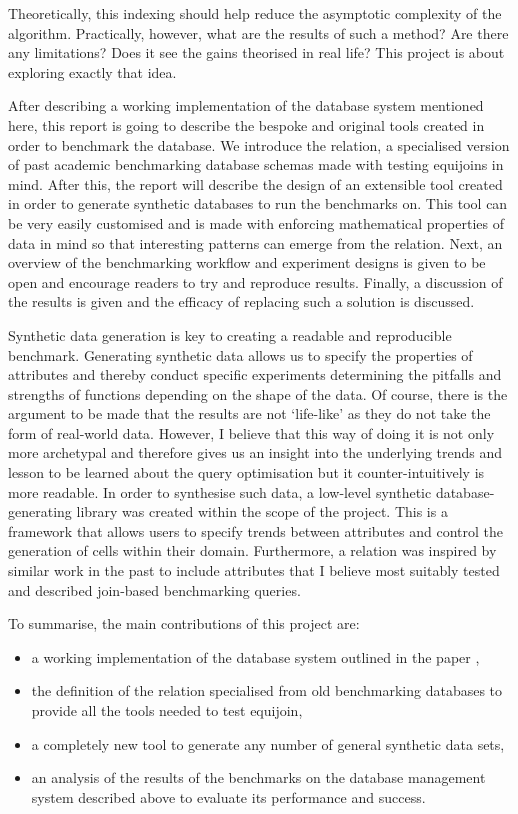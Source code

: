 Theoretically, this indexing should help reduce the asymptotic complexity of
the algorithm. Practically, however, what are the results of such a method? Are
there any limitations? Does it see the gains theorised in real life? This
project is about exploring exactly that idea.

After describing a working implementation of the database system mentioned here,
this report is going to describe the bespoke and original tools created in order
to benchmark the database. We introduce the  relation, a
specialised version of past academic benchmarking database schemas made with
testing equijoins in mind. After this, the report will describe the design of
an extensible tool created in order to generate synthetic databases to run the
benchmarks on. This tool can be very easily customised and is made with enforcing
mathematical properties of data in mind so that interesting patterns can emerge
from the  relation. Next, an overview of the benchmarking
workflow and experiment designs is given to be open and encourage readers to try
and reproduce results. Finally, a discussion of the results is given and the
efficacy of replacing such a solution is discussed.

Synthetic data generation is key to creating a readable and reproducible
benchmark. Generating synthetic data allows us to specify the properties of
attributes and thereby conduct specific experiments determining the pitfalls and
strengths of functions depending on the shape of the data. Of course, there is
the argument to be made that the results are not `life-like' as they do not take
the form of real-world data. However, I believe that this way of doing it is not
only more archetypal and therefore gives us an insight into the underlying trends
and lesson to be learned about the query optimisation but it counter-intuitively
is more readable. In order to synthesise such data, a low-level synthetic
database-generating library was created within the scope of the project. This is
a framework that allows users to specify trends between attributes and control
the generation of cells within their domain. Furthermore, a 
relation was inspired by similar work in the past to include attributes that I
believe most suitably tested and described join-based benchmarking queries.

To summarise, the main contributions of this project are:
\begin{itemize}
    \item a working implementation of the database system outlined in the paper
        \relalg{},
    \item the definition of the  relation specialised from
        old benchmarking databases to provide all the tools needed to test
        equijoin,
    \item a completely new tool to generate any number of general synthetic data
        sets,
    \item an analysis of the results of the benchmarks on the database
        management system described above to evaluate its performance and
        success.
\end{itemize}

